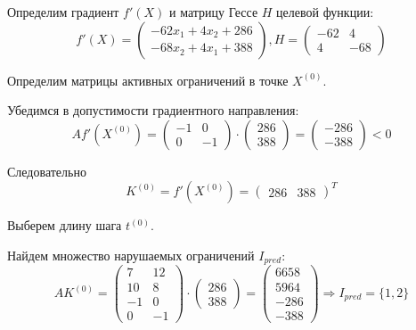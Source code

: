 Определим градиент $f'(X)$ и матрицу Гессе $H$ целевой функции:
\begin{equation*}
f'(X) = \begin{pmatrix} 
	-62 x_1 + 4 x_2 + 286 \\
	-68 x_2 + 4 x_1 + 388
\end{pmatrix}, 
H =
\begin{pmatrix}
	-62 & 4 \\
	4 & -68
\end{pmatrix}
\end{equation*}

Определим матрицы активных ограничений в точке $X^{(0)}$.

Убедимся в допустимости градиентного направления:
\begin{equation*}
A f'(X^{(0)}) = \begin{pmatrix}
	-1 & 0 \\
	0 & -1
\end{pmatrix} 
\cdot \begin{pmatrix}
	286 \\
	388
\end{pmatrix} =
 \begin{pmatrix}
	-286 \\
	-388
\end{pmatrix} < 0 
\end{equation*}

Следовательно
\begin{equation*}
K^{(0)} = f'(X^{(0)}) = \begin{pmatrix} 286 & 388 \end{pmatrix}^T
\end{equation*}

Выберем длину шага $t^{(0)}$.

Найдем множество нарушаемых ограничений $I_{pred}$:
\begin{equation*}
A K^{(0)} = \begin{pmatrix}
	7 & 12 \\
	10 & 8 \\
	-1 & 0 \\
	0 & -1
\end{pmatrix} \cdot \begin{pmatrix}
	286 \\
	388
\end{pmatrix} = \begin{pmatrix}
	6658 \\
	5964 \\
	-286 \\
	-388
\end{pmatrix}
\Longrightarrow
I_{pred} = \{1, 2\}
\end{equation*}

